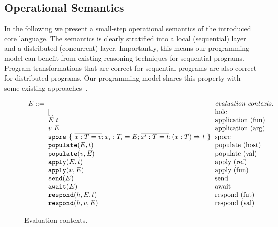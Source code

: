 \subsection{Operational Semantics}\label{sec:opsem}

In the following we present a small-step operational semantics of the
introduced core language. The semantics is clearly stratified into a
local (sequential) layer and a distributed (concurrent)
layer. Importantly, this means our programming model can benefit from
existing reasoning techniques for sequential programs. Program
transformations that are correct for sequential programs are also
correct for distributed programs. Our programming model shares this
property with some existing approaches~\cite{ConcurrentHaskell}.

\begin{figure}
\centering
 $\ba[t]{l@{\hspace{2mm}}l}
E ::=                                                                                                     & \mbox{\it{evaluation contexts:}} \\
\gap \:\:\:\: [~]                                                                                         & \mbox{hole} \\
\gap ~|~  E~t                                                                                             & \mbox{application (fun)} \\
\gap ~|~  v~E                                                                                             & \mbox{application (arg)} \\
\gap ~|~  \texttt{spore}~\{~\seq{x : T = v} ; x_i : T_i = E ; \seq{x' : T = t} ; (x: T) \Rightarrow t~\}  & \mbox{spore} \\
\gap ~|~  \texttt{populate}(E, t)                                                                         & \mbox{populate (host)} \\
\gap ~|~  \texttt{populate}(v, E)                                                                         & \mbox{populate (val)} \\
\gap ~|~  \texttt{apply}(E, t)                                                                            & \mbox{apply (ref)} \\
\gap ~|~  \texttt{apply}(v, E)                                                                            & \mbox{apply (fun)} \\
\gap ~|~  \texttt{send}(E)                                                                                & \mbox{send} \\
\gap ~|~  \texttt{await}(E)                                                                               & \mbox{await} \\
\gap ~|~  \texttt{respond}(h, E, t)                                                                       & \mbox{respond (fut)} \\
\gap ~|~  \texttt{respond}(h, v, E)                                                                       & \mbox{respond (val)} \\
\ea$
\caption{Evaluation contexts.}\label{fig:eval-ctx}
\end{figure}

